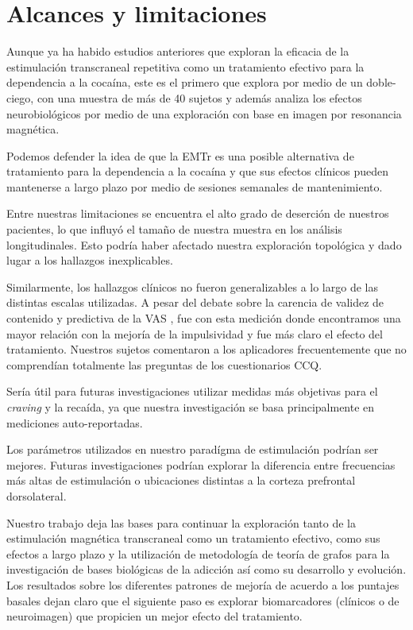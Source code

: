 \section{Alcances y limitaciones}
Aunque ya ha habido estudios anteriores que exploran la eficacia de la estimulación transcraneal repetitiva como un tratamiento efectivo para la dependencia a la cocaína, este es el primero que explora por medio de un doble-ciego, con una muestra de más de 40 sujetos y además analiza los efectos neurobiológicos por medio de una exploración con base en imagen por resonancia magnética. \par
Podemos defender la idea de que la EMTr es una posible alternativa de tratamiento para la dependencia a la cocaína y que sus efectos clínicos pueden mantenerse a largo plazo por medio de sesiones semanales de mantenimiento. \par
Entre nuestras limitaciones se encuentra el alto grado de deserción de nuestros pacientes, lo que influyó el tamaño de nuestra muestra en los análisis longitudinales. Esto podría haber afectado nuestra exploración topológica y dado lugar a los hallazgos inexplicables. \par
Similarmente, los hallazgos clínicos no fueron generalizables a lo largo de las distintas escalas utilizadas. A pesar del debate sobre la carencia de validez de contenido y predictiva de la VAS \parencite{Ekhtiari2019}, fue con esta medición donde encontramos una mayor relación con la mejoría de la impulsividad y fue más claro el efecto del tratamiento. Nuestros sujetos comentaron a los aplicadores frecuentemente que no comprendían totalmente las preguntas de los cuestionarios CCQ. \par
Sería útil para futuras investigaciones utilizar medidas más objetivas para el \textit{craving} y la recaída, ya que nuestra investigación se basa principalmente en mediciones auto-reportadas. \par
Los parámetros utilizados en nuestro paradígma de estimulación podrían ser mejores. Futuras investigaciones podrían explorar la diferencia entre frecuencias más altas de estimulación o ubicaciones distintas a la corteza prefrontal dorsolateral.\par
Nuestro trabajo deja las bases para continuar la exploración tanto de la estimulación magnética transcraneal como un tratamiento efectivo, como sus efectos a largo plazo y la utilización de metodología de teoría de grafos para la investigación de bases biológicas de la adicción así como su desarrollo y evolución. Los resultados sobre los diferentes patrones de mejoría de acuerdo a los puntajes basales dejan claro que el siguiente paso es explorar biomarcadores (clínicos o de neuroimagen) que propicien un mejor efecto del tratamiento.
